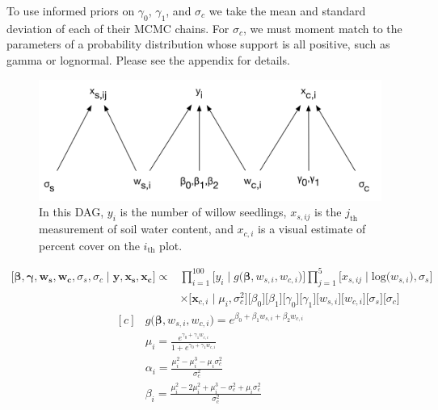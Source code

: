 \documentclass[12pt, oneside]{article}
\begin{document}
\begin{enumerate}[leftmargin=*]
To use informed priors on $\gamma_{0}$, $\gamma_{1}$, and $\sigma_{c}$ we take the mean and standard deviation of each of their MCMC chains. For $\sigma_{c}$, we must moment match to the parameters of a probability distribution whose support is all positive, such as gamma or lognormal. Please see the appendix for details.
\newpage


\begin{figure}[H]
\begin{center}
\includegraphics[width=5.75in]{WillowDAG.png}
\caption{In this DAG, $y_{i}$ is the number of willow seedlings, $x_{s,ij}$ is the $j_{\textrm{th}}$ measurement of soil water content, and $x_{c,i}$ is a visual estimate of percent cover on the $i_{\textrm{th}}$ plot.}
\end{center}
\end{figure}
\begin{align*}
\big[\bm{\beta}, \bm{\gamma}, \bm{w_{s}}, \bm{w_{c}}, \sigma_{s}, \sigma_{c} \mid \bm{y}, \bm{x_{s}}, \bm{x_{c}} \big] \varpropto & \prod_{i=1}^{100} \big[y_{i} \mid g\big(\bm{\beta}, w_{s,i}, w_{c,i}\big)\big] \prod_{j=1}^{5} \big[x_{s,ij} \mid \textrm{log}\big(w_{s,i}\big), \sigma_{s} \big]\\
&\times  \big[\bm{x}_{c,i} \mid \mu_{i}, \sigma^{2}_{c} \big] \big[\beta_{0} \big] \big[\beta_{1} \big] \big[\gamma_{0} \big] \big[\gamma_{1} \big] \big[w_{s,i}\big] \big[w_{c,i}\big] \big[\sigma_{s}\big] \big[\sigma_{c}\big]       
\end{align*}
\begin{equation*}
\begin{aligned}[c]
&g\big(\bm{\beta}, w_{s,i}, w_{c,i} \big) =e^{\beta_{0} + \beta_{1} w_{s,i} + \beta_{2} w_{c,i}}\\
&\mu_{i}= \frac{e^{\gamma_{0} + \gamma_1 w_{c,i}}}{1 + e^{\gamma_{0} + \gamma_1 w_{c,i}}} \\
&\alpha_{i} =  \frac{\mu_{i}^{2} - \mu_{i}^{3} - \mu_{i}\sigma^{2}_{c}}{\sigma^{2}_{c}} \\
&\beta_{i} =  \frac{\mu_{i}^{2} - 2\mu_{i}^{2} + \mu_{i}^{3} - \sigma^{2}_{c} + \mu_{i}\sigma^{2}_{c}}{\sigma^{2}_{c}} \\

\end{aligned}
\end{equation*}
\end{enumerate}
\end{document}
